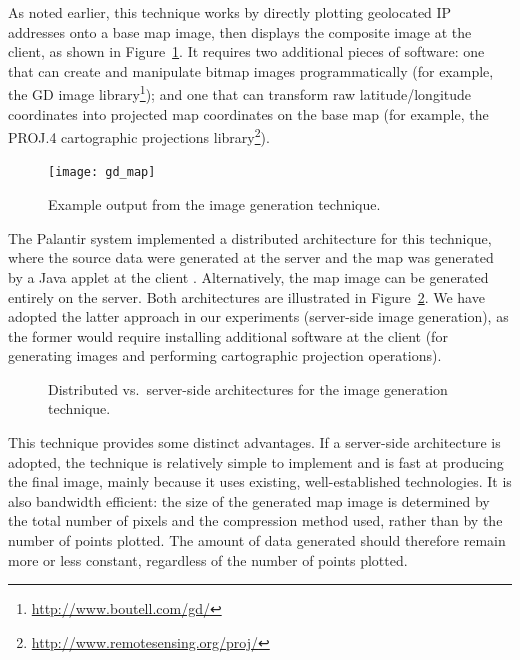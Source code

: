 \documentclass[acmtocl,acmnow]{acmtrans2m}
\begin{document}
As noted earlier, this technique works by directly plotting geolocated
IP addresses onto a base map image, then displays the composite image at
the client, as shown in Figure~\ref{fig-image}. It requires two
additional pieces of software: one that can create and manipulate bitmap
images programmatically (for example, the GD image
library\footnote{\url{http://www.boutell.com/gd/}}); and one that can
transform raw latitude/longitude coordinates into projected map
coordinates on the base map (for example, the PROJ.4 cartographic
projections library\footnote{\url{http://www.remotesensing.org/proj/}}).


\begin{figure}
	\begin{center}
		\texttt{[image: gd\_map]}
	\end{center}
	\caption{Example output from the image generation technique.}
	\label{fig-image}
\end{figure}


The Palantir system implemented a distributed architecture for this
technique, where the source data were generated at the server and the
map was generated by a Java applet at the client
\cite{Papa-N-1998-Palantir}. Alternatively, the map image can be
generated entirely on the server. Both architectures are illustrated in
Figure~\ref{fig-image-architecture}. We have adopted the latter approach
in our experiments (server-side image generation), as the former would
require installing additional software at the client (for generating
images and performing cartographic projection operations).


\begin{figure}
	\caption{Distributed vs.\ server-side architectures for the image
	generation technique.}
	\label{fig-image-architecture}
\end{figure}


This technique provides some distinct advantages. If a server-side
architecture is adopted, the technique is relatively simple to implement
and is fast at producing the final image, mainly because it uses
existing, well-established technologies. It is also bandwidth efficient:
the size of the generated map image is determined by the total number of
pixels and the compression method used, rather than by the number of
points plotted. The amount of data generated should therefore remain
more or less constant, regardless of the number of points plotted.
\end{document}
